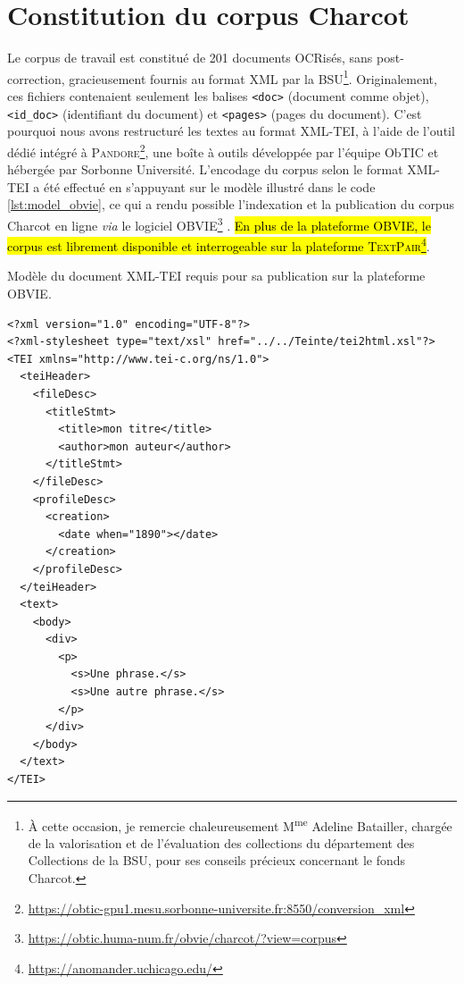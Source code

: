 \section{Constitution du corpus Charcot}
Le corpus de travail est constitué de 201 documents OCRisés, sans post-correction, gracieusement fournis au format \textsc{XML} par la \textsc{BSU}\footnote{À cette occasion, je remercie chaleureusement M\textsuperscript{me} Adeline Batailler, chargée de la valorisation et de l'évaluation des collections du département des Collections de la \textsc{BSU}, pour ses conseils précieux concernant le fonds Charcot.}. Originalement, ces fichiers contenaient seulement les balises \texttt{<doc>} (document comme objet), \texttt{<id\_doc>} (identifiant du document) et \texttt{<pages>} (pages du document). C'est pourquoi nous avons restructuré les textes au format \textsc{XML-TEI}, à l'aide de l’outil dédié intégré à \textsc{Pandore}\footnote{\url{https://obtic-gpu1.mesu.sorbonne-universite.fr:8550/conversion_xml}}, une boîte à outils développée par l'équipe ObTIC et hébergée par Sorbonne Université. L'encodage du corpus selon le format \textsc{XML-TEI} a été effectué en s'appuyant sur le modèle illustré dans le code \ref{lst:model_obvie}, ce qui a rendu possible l'indexation et la publication du corpus Charcot en ligne \textit{via} le logiciel \textsc{OBVIE}\footnote{\url{https://obtic.huma-num.fr/obvie/charcot/?view=corpus}} \citep{alrahabi2022obvie}. \hl{En plus de la plateforme \textsc{OBVIE}, le corpus est librement disponible et interrogeable sur la plateforme \textsc{TextPair}\footnote{\url{https://anomander.uchicago.edu/}}}.
\begin{listing}[h]
	\caption{Modèle du document \textsc{XML-TEI} requis pour sa publication sur la plateforme \textsc{OBVIE}.}
	\label{lst:model_obvie}
\begin{verbatim}
<?xml version="1.0" encoding="UTF-8"?>
<?xml-stylesheet type="text/xsl" href="../../Teinte/tei2html.xsl"?>
<TEI xmlns="http://www.tei-c.org/ns/1.0">
  <teiHeader>
    <fileDesc>
      <titleStmt>
        <title>mon titre</title>
        <author>mon auteur</author>
      </titleStmt>
    </fileDesc>
    <profileDesc>
      <creation>
        <date when="1890"></date>
      </creation>
    </profileDesc>
  </teiHeader>
  <text>
    <body>
      <div>
        <p>
          <s>Une phrase.</s>
          <s>Une autre phrase.</s>
        </p>
      </div>
    </body>
  </text>
</TEI>
\end{verbatim}
\end{listing}


